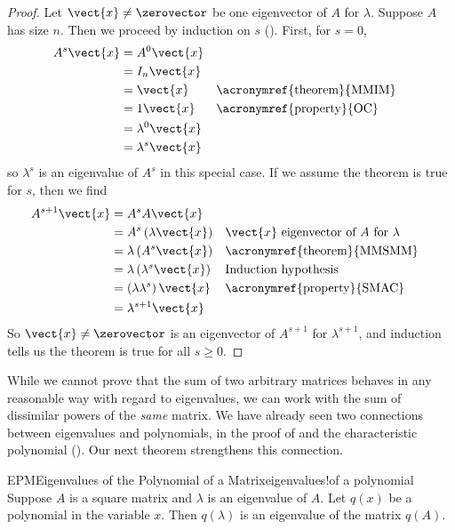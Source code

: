\begin{proof}
%
Let $\vect{x}\neq\zerovector$ be one eigenvector of $A$ for $\lambda$.  Suppose $A$ has size $n$.  Then we proceed by induction on $s$ ().  First, for $s=0$,
%
\begin{align*}
A^s\vect{x}&=A^0\vect{x}\\
&=I_n\vect{x}\\
&=\vect{x}&&\text{\acronymref{theorem}{MMIM}}\\
&=1\vect{x}&&\text{\acronymref{property}{OC}}\\
&=\lambda^0\vect{x}\\
&=\lambda^s\vect{x}\\
\end{align*}
%
so $\lambda^s$ is an eigenvalue of $A^s$ in this special case.  If we assume the theorem is true for $s$, then we find
%
\begin{align*}
A^{s+1}\vect{x}&=A^sA\vect{x}\\
&=A^s\left(\lambda\vect{x}\right)&&\text{$\vect{x}$ eigenvector of $A$ for $\lambda$}\\
&=\lambda\left(A^s\vect{x}\right)&&\text{\acronymref{theorem}{MMSMM}}\\
&=\lambda\left(\lambda^s\vect{x}\right)&&\text{Induction hypothesis}\\
&=\left(\lambda\lambda^s\right)\vect{x}&&\text{\acronymref{property}{SMAC}}\\
&=\lambda^{s+1}\vect{x}
\end{align*}
%
So $\vect{x}\neq\zerovector$ is an eigenvector of $A^{s+1}$ for $\lambda^{s+1}$, and induction tells us the theorem is true for all $s\geq 0$.
%
\end{proof}
%
While we cannot prove that the sum of two arbitrary matrices behaves in any reasonable way with regard to eigenvalues, we can work with the sum of dissimilar powers of the {\em same} matrix.  We have already seen two connections between eigenvalues and polynomials, in the proof of  and the characteristic polynomial ().  Our next theorem strengthens this connection.
%
\begin{theorem}{EPM}{Eigenvalues of the Polynomial of a Matrix}{eigenvalues!of a polynomial}
Suppose $A$ is a square matrix and $\lambda$ is an eigenvalue of $A$.  Let $q(x)$ be a polynomial in the variable $x$.  Then $q(\lambda)$ is an eigenvalue of the matrix $q(A)$.
\end{theorem}
%
